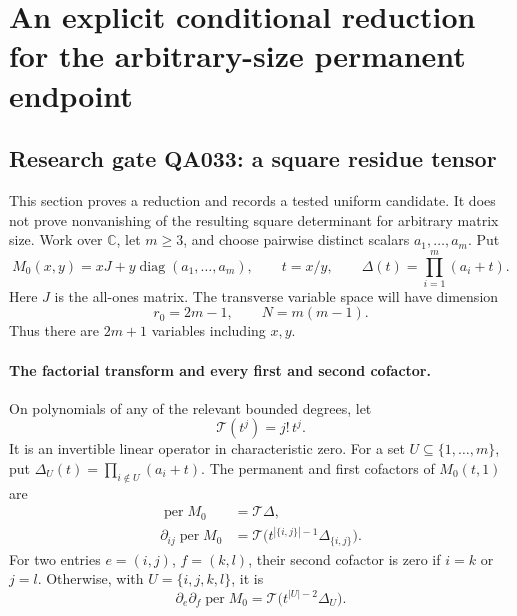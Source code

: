 \section{An explicit conditional reduction for the arbitrary-size permanent endpoint}

\subsection*{Research gate QA033: a square residue tensor}
This section proves a reduction and records a tested uniform
candidate. It does not prove nonvanishing of the resulting
square determinant for arbitrary matrix size.
Work over \(\mathbb C\), let \(m\geq3\), and choose pairwise
distinct scalars \(a_1,\ldots,a_m\). Put
\[
 M_0(x,y)=xJ+y\operatorname{diag}(a_1,\ldots,a_m),\qquad
 t=x/y,\qquad \Delta(t)=\prod_{i=1}^m(a_i+t).
                                                               \tag{RJ.1}
\]
Here \(J\) is the all-ones matrix.
The transverse variable space will have dimension
\[
                  r_0=2m-1,\qquad
                  N=m(m-1).
                                                               \tag{RJ.2}
\]
Thus there are \(2m+1\) variables including \(x,y\).

\paragraph{The factorial transform and every first and second cofactor.}
On polynomials of any of the relevant bounded degrees, let
\[
                       \mathcal T(t^j)=j!\,t^j.
                                                               \tag{RJ.3}
\]
It is an invertible linear operator in characteristic zero.
For a set \(U\subseteq\{1,\ldots,m\}\), put
\(\Delta_U(t)=\prod_{i\notin U}(a_i+t)\).
The permanent and first cofactors of \(M_0(t,1)\) are
\[
 \begin{split}
 \operatorname{per}M_0&=\mathcal T\Delta,\\
 \partial_{ij}\operatorname{per}M_0
       &=\mathcal T\bigl(t^{|\{i,j\}|-1}\Delta_{\{i,j\}}\bigr).
 \end{split}                                                   \tag{RJ.4}
\]
For two entries \(e=(i,j)\), \(f=(k,l)\), their second
cofactor is zero if \(i=k\) or \(j=l\).
Otherwise, with \(U=\{i,j,k,l\}\), it is
\[
 \partial_e\partial_f\operatorname{per}M_0
             =\mathcal T\bigl(t^{|U|-2}\Delta_U\bigr).
                                                               \tag{RJ.5}
\]


